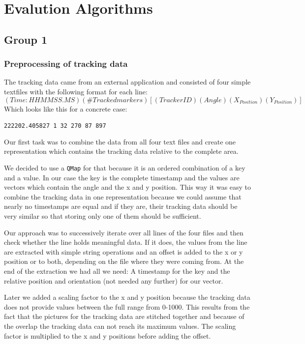 \documentclass[twoside]{article}
\begin{document}
\section{Evalution Algorithms}
\subsection{Group 1}
\subsubsection{Preprocessing of tracking data} %
The tracking data came from an external application and consisted of four simple textfiles with the following format for each line:
\[(Time:HHMMSS.MS) (\#Tracked markers) [(Tracker ID) (Angle) (X_{Position}) (Y_{Position})] \]
Which looks like this for a concrete case:
\begin{center}
\texttt{222202.405827\ 1\ 32\ 270\ 87\ 897}
\end{center}
Our first task was to combine the data from all four text files and create one representation which contains the tracking data relative to the complete area. 

We decided to use a \texttt{QMap} for that because it is an ordered combination of a key and a value. In our case the key is the complete timestamp and the values are vectors which contain the angle and the x and y position. This way it was easy to combine the tracking data in one representation because we could assume that nearly no timestamps are equal and if they are, their tracking data should be very similar so that storing only one of them should be sufficient.

Our approach was to successively iterate over all lines of the four files and then check whether the line holds meaningful data. If it does, the values from the line are extracted with simple string operations and an offset is added to the x or y position or to both, depending on the file where they were coming from. At the end of the extraction we had all we need: A timestamp for the key and the relative position and orientation (not needed any further) for our vector.

Later we added a scaling factor to the x and y position because the tracking data does not provide values between the full range from 0-1000. This results from the fact that the pictures for the tracking data are stitched together and because of the overlap the tracking data can not reach its maximum values. The scaling factor is multiplied to the x and y positions before adding the offset.
\end{document}
